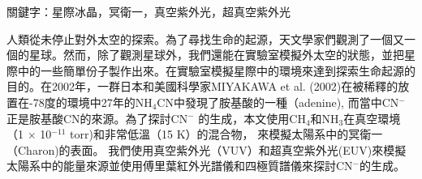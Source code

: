 \begin{abstractcn}

關鍵字：星際冰晶，冥衛一，真空紫外光，超真空紫外光
\vspace{2em}

人類從未停止對外太空的探索。為了尋找生命的起源，天文學家們觀測了一個又一個的星球。然而，除了觀測星球外，我們還能在實驗室模擬外太空的狀態，並把星際中的一些簡單份子製作出來。在實驗室模擬星際中的環境來達到探索生命起源的目的。在2002年，一群日本和美國科學家MIYAKAWA et al. (2002)\cite{miyakawa2002cold}在被稀釋的放置在-78度的環境中27年的NH$_4$CN中發現了胺基酸的一種（adenine), 而當中CN$^-$正是胺基酸CN的來源。為了探討CN$^-$ 的生成，本文使用CH$_4$和NH$_3$在真空環境（1 $\times$ 10$^{-11}$ torr)和非常低溫（15 K）的混合物， 來模擬太陽系中的冥衛一（Charon)的表面。 我們使用真空紫外光（VUV）和超真空紫外光(EUV)來模擬太陽系中的能量來源並使用傅里葉紅外光譜儀和四極質譜儀來探討CN$^-$的生成。

\end{abstractcn} 
